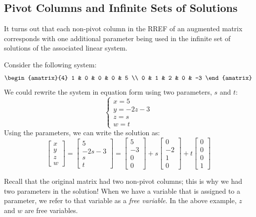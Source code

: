 \documentclass[11pt]{exam}
\begin{document}
    \vspace{20px}
    \subsection{Pivot Columns and Infinite Sets of Solutions}
    It turns out that each non-pivot column in the RREF of an augmented matrix corresponds with one additional parameter being used in the infinite
    set of solutions of the associated linear system.

    Consider the following system:
    $$\begin{amatrix}{4}
        1 & 0 & 0 & 0 & 5 \\
        0 & 1 & 2 & 0 & -3
    \end{amatrix}$$
    We could rewrite the system in equation form using two parameters, $s$ and $t$:
    $$\begin{cases}
        x = 5 \\
        y = -2z - 3 \\
        z = s \\
        w = t
    \end{cases}$$
    Using the parameters, we can write the solution as:
    $$\begin{bmatrix} x \\ y \\ z \\ w \end{bmatrix} = \begin{bmatrix} 5 \\ -2s - 3 \\ s \\ t \end{bmatrix}
    = \begin{bmatrix} 5 \\ -3 \\ 0 \\ 0 \end{bmatrix}
    + s\begin{bmatrix} 0 \\ -2 \\ 1 \\ 0 \end{bmatrix}
    + t\begin{bmatrix} 0 \\ 0 \\ 0 \\ 1 \end{bmatrix}$$

    Recall that the original matrix had two non-pivot columns; this is why we had two parameters in the solution! When we have a variable
    that is assigned to a parameter, we refer to that variable as a \textit{free variable}. In the above example, $z$ and $w$ are free variables.
\end{document}
